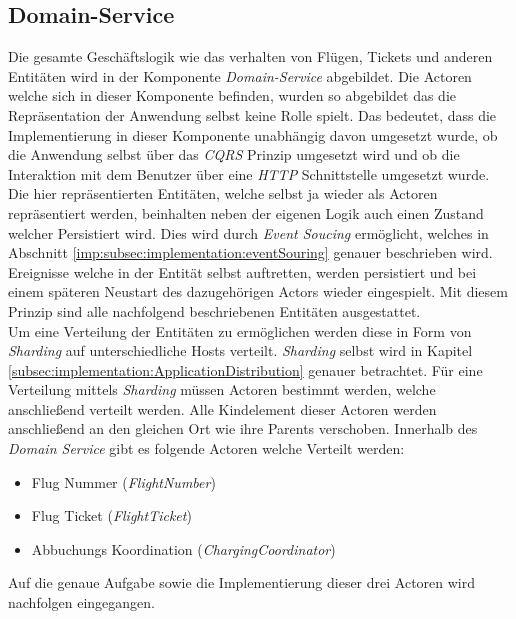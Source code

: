 \subsection{Domain-Service}
\label{subsec:implementation:domainService} 
Die gesamte Geschäftslogik wie das verhalten von Flügen, Tickets und anderen Entitäten wird in der Komponente \textit{Domain-Service}  abgebildet. Die Actoren welche sich in dieser Komponente befinden, wurden so abgebildet das die Repräsentation der Anwendung selbst keine Rolle spielt. Das bedeutet, dass die Implementierung in dieser Komponente unabhängig davon umgesetzt wurde, ob die Anwendung selbst über das \textit{CQRS} Prinzip umgesetzt wird und ob die Interaktion mit dem Benutzer über eine \textit{HTTP} Schnittstelle umgesetzt wurde. \\
Die hier repräsentierten Entitäten, welche selbst ja wieder als Actoren repräsentiert werden, beinhalten neben der eigenen Logik auch einen Zustand welcher Persistiert wird. Dies wird durch \textit{Event Soucing} ermöglicht, welches in Abschnitt \ref{imp:subsec:implementation:eventSouring} genauer beschrieben wird. Ereignisse welche in der Entität selbst auftretten, werden persistiert und bei einem späteren Neustart des dazugehörigen Actors wieder eingespielt. Mit diesem Prinzip sind alle nachfolgend beschriebenen Entitäten ausgestattet. \\
Um eine Verteilung der Entitäten zu ermöglichen werden diese in Form von \textit{Sharding} auf unterschiedliche Hosts verteilt. \textit{Sharding} selbst wird in Kapitel \ref{subsec:implementation:ApplicationDistribution} genauer betrachtet. Für eine Verteilung mittels \textit{Sharding} müssen Actoren bestimmt werden, welche anschließend verteilt werden. Alle Kindelement dieser Actoren werden anschließend an den gleichen Ort wie ihre Parents verschoben. Innerhalb des \textit{Domain Service} gibt es folgende Actoren welche Verteilt werden:
\begin{itemize}
    \item Flug Nummer (\textit{FlightNumber})
    \item Flug Ticket (\textit{FlightTicket})
    \item Abbuchungs Koordination (\textit{ChargingCoordinator})
\end{itemize}
Auf die genaue Aufgabe sowie die Implementierung dieser drei Actoren wird nachfolgen eingegangen.